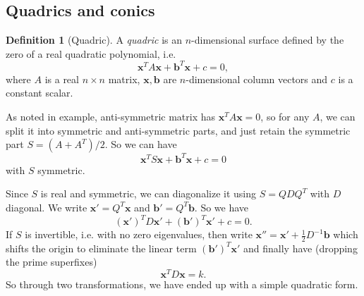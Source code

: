 \documentclass[a4paper]{article}
\theoremstyle{definition}
\newtheorem*{defi}{Definition}
\newcommand{\mb}[1]{\mathbf{#1}}
\begin{document}
\subsection{Quadrics and conics}

\begin{defi}[Quadric]
  A \emph{quadric} is an $n$-dimensional surface defined by the zero of a real quadratic polynomial, i.e.
\[
\mb{x}^T A\mb{x} + \mb{b}^T\mb{x} + c = 0,
\]
where $A$ is a real $n\times n$ matrix, $\mb{x}, \mb{b}$ are $n$-dimensional column vectors and $c$ is a constant scalar.
\end{defi}

As noted in example, anti-symmetric matrix has $\mb{x}^TA\mb{x} = 0$, so for any $A$, we can split it into symmetric and anti-symmetric parts, and just retain the symmetric part $S = (A + A^T)/2$. So we can have
\[
\mb{x}^T S\mb{x} + \mb{b}^T\mb{x} + c = 0
\]
with $S$ symmetric.

Since $S$ is real and symmetric, we can diagonalize it using $S = QDQ^T$ with $D$ diagonal. We write $\mb{x}' = Q^T \mb{x}$ and $\mb{b}' = Q^T \mb{b}$. So we have
\[
(\mb{x}')^TD\mb{x}' + (\mb{b}')^T \mb{x}' + c = 0.
\]
If $S$ is invertible, i.e. with no zero eigenvalues, then write $\mb{x}'' = \mb{x}' + \frac{1}{2}D^{-1}\mb{b}$ which shifts the origin to eliminate the linear term $(\mb{b}')^T\mb{x}'$ and finally have (dropping the prime superfixes)
\[
\mb{x}^TD\mb{x} = k.
\]
So through two transformations, we have ended up with a simple quadratic form.
\end{document}
